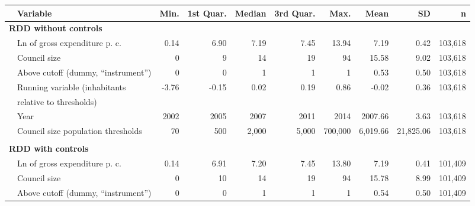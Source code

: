 \begin{tabular}{llrrrrrrrr}
  \toprule \midrule
&Variable & Min. & 1st Quar. & Median & 3rd Quar. & Max. & Mean & SD & n \\ 
  \midrule
\multicolumn{10}{l}{\textbf{\acs{RDD} without controls}} \\ 
  &Ln of gross expenditure \acs{p. c.} & 0.14 & 6.90 & 7.19 & 7.45 & 13.94 & 7.19 & 0.42 & 103,618 \\ 
  &Council size & 0 & 9 & 14 & 19 & 94 & 15.58 & 9.02 & 103,618 \\ 
  &Above cutoff (dummy, ``instrument'') & 0 & 0 & 1 & 1 & 1 & 0.53 & 0.50 & 103,618 \\ 
  &Running variable (inhabitants & -3.76 & -0.15 & 0.02 & 0.19 & 0.86 & -0.02 & 0.36 & 103,618 \\ 
  &\hspace{5mm} relative to thresholds)  & & &  &  &  &  &  & \\
  &Year & 2002 & 2005 & 2007 & 2011 & 2014 & 2007.66 & 3.63 & 103,618 \\ 
  &Council size population thresholds & 70 & 500 & 2,000 & 5,000 & 700,000 & 6,019.66 & 21,825.06 & 103,618 \\
  
  
  
  &&&&&&&&& \\
  \hline
  \multicolumn{10}{l}{\textbf{\acs{RDD} with controls}} \\ 
  &Ln of gross expenditure \acs{p. c.} & 0.14 & 6.91 & 7.20 & 7.45 & 13.80 & 7.19 & 0.41 & 101,409 \\ 
  &Council size & 0 & 10 & 14 & 19 & 94 & 15.78 & 8.99 & 101,409 \\ 
  &Above cutoff (dummy, ``instrument'') & 0 & 0 & 1 & 1 & 1 & 0.54 & 0.50 & 101,409 \\ 
  

\end{tabular}
